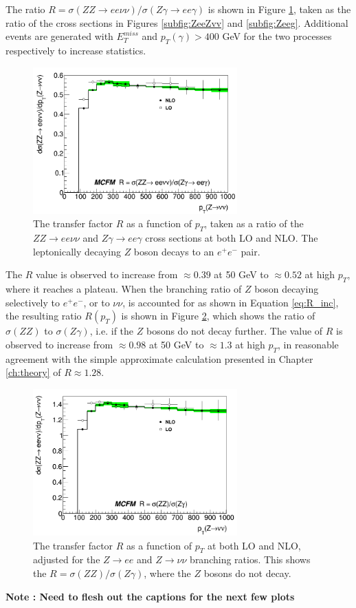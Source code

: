\documentclass[11pt,a4paper,openright,twoside]{report}
\newcommand{\met}{$E_T^{miss}$ }
\begin{document}
The ratio $R = \sigma(ZZ\rightarrow ee\nu\nu)/\sigma(Z\gamma\rightarrow ee\gamma)$ is shown in Figure \ref{fig:Rcurve}, taken as the ratio of the cross sections in Figures \ref{subfig:ZeeZvv} and \ref{subfig:Zeeg}. Additional events are generated with \met and $p_T(\gamma) > 400$ GeV for the two processes respectively to increase statistics. 
\begin{figure}[H]
	\centering
	\includegraphics[width= 0.7\textwidth]{R.png}
	\caption{The transfer factor $R$ as a function of $p_T$, taken as a ratio of  the $ZZ\to ee\nu\nu$ and $Z\gamma\to ee\gamma$ cross sections at both LO and NLO. The leptonically decaying $Z$ boson decays to an $e^+e^-$ pair.}
	\label{fig:Rcurve}
\end{figure}
The $R$ value is observed to increase from $\approx 0.39$ at 50 GeV to $\approx 0.52$ at high $p_T$, where it reaches a plateau. When the branching ratio of $Z$ boson decaying selectively to $e^+e^-$, or to $\nu\nu$, is accounted for as shown in Equation \ref{eq:R_inc}, the resulting ratio $R(p_T)$ is shown in Figure \ref{fig:RcurveBR}, which shows the ratio of $\sigma(ZZ)$ to $\sigma(Z\gamma)$, i.e. if the $Z$ bosons do not decay further. The value of $R$ is observed to increase from $\approx 0.98$ at 50 GeV to $\approx 1.3$ at high $p_T$, in reasonable agreement with the simple approximate calculation presented in Chapter \ref{ch:theory} of $R \approx 1.28$.
\begin{figure}[H]
	\centering
	\includegraphics[width = 0.7\textwidth]{R_BR.png}
	\caption{The transfer factor $R$ as a function of $p_T$ at both LO and NLO, adjusted for the $Z\rightarrow ee$ and $Z\rightarrow \nu\nu$ branching ratios. This shows the $R=\sigma(ZZ)/\sigma(Z\gamma)$, where the $Z$ bosons do not decay.}
	\label{fig:RcurveBR}
\end{figure}
\textbf{Note : Need to flesh out the captions for the next few plots}
\end{document}
